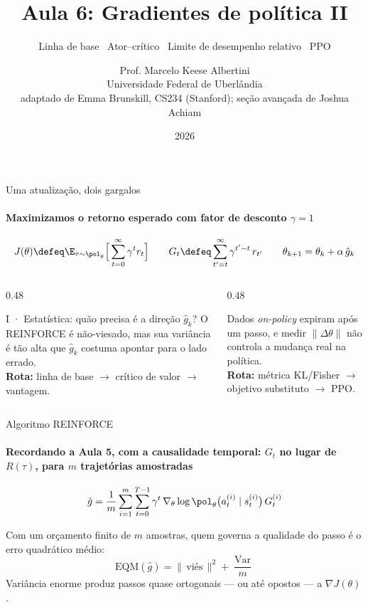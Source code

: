 \documentclass[aspectratio=169, 11pt]{beamer}
\title[Aula 6 — Gradientes de política II]{Aula 6: Gradientes de política II}
\subtitle[Aprendizagem por Reforço]{Linha de base \textbullet\ Ator--crítico \textbullet\ Limite de desempenho relativo \textbullet\ PPO}
\author[Prof. Marcelo K. Albertini]{Prof. Marcelo Keese Albertini \\
  \footnotesize Universidade Federal de Uberlândia \\
  \footnotesize adaptado de Emma Brunskill, CS234 (Stanford); seção avançada de Joshua Achiam}
\institute{Universidade Federal de Uberlândia}
\date{2026}
\newcommand{\ghat}{\hat{g}}
\newcommand{\Var}{\operatorname{Var}}
\begin{document}
\begin{frame}\titlepage\end{frame}

\begin{frame}{Uma atualização, dois gargalos}
  \framesubtitle{Maximizamos o retorno esperado com fator de desconto $\gamma = 1$}

  \[
    J(\theta) \defeq \E_{\tau\sim\pol_\theta}\Big[\sum_{t=0}^{\infty}\gamma^t r_t\Big]
    \qquad
    G_t \defeq \sum_{t'=t}^{\infty}\gamma^{t'-t}\, r_{t'}
    \qquad
    \theta_{k+1} = \theta_k + \alpha\,\ghat_k
  \]

  \begin{columns}[T]
    \begin{column}{0.48\textwidth}
      \begin{teobox}{I · Estatística: quão precisa é a direção $\ghat_k$?}
        \small O REINFORCE é não-viesado, mas sua variância é tão alta que
        $\ghat_k$ costuma apontar para o lado errado.\\[0.3em]
        \textbf{Rota:} linha de base $\to$ crítico de valor $\to$ vantagem.
      \end{teobox}
    \end{column}
    \begin{column}{0.48\textwidth}
      \begin{exbox}[title={II · Geometria: qual o maior passo seguro?}]{}
        \small Dados \emph{on-policy} expiram após um passo, e medir
        $\|\Delta\theta\|$ não controla a mudança real na política.\\[0.3em]
        \textbf{Rota:} métrica KL/Fisher $\to$ objetivo substituto $\to$ PPO.
      \end{exbox}
    \end{column}
  \end{columns}
\end{frame}

\begin{frame}{Algoritmo REINFORCE}
  \framesubtitle{Recordando a Aula 5, com a causalidade temporal: $G_t$ no lugar de $R(\tau)$, para $m$ trajetórias amostradas}

  \[
    \ghat = \frac{1}{m}\sum_{i=1}^{m}\sum_{t=0}^{T-1}\gamma^t\,
      \nabla_\theta\log\pol_\theta\big(a_t^{(i)}\mid s_t^{(i)}\big)\,G_t^{(i)}
  \]

  \begin{alertabox}[title={Não-viesado não significa utilizável}]
    Com um orçamento finito de $m$ amostras, quem governa a qualidade do passo
    é o erro quadrático médio:
    \[
      \mathrm{EQM}(\ghat) = \big\|\,\text{viés}\,\big\|^2 + \frac{\Var}{m}
    \]
    Variância enorme produz passos quase ortogonais --- ou até opostos --- a $\nabla J(\theta)$.
  \end{alertabox}
\end{frame}
\end{document}
